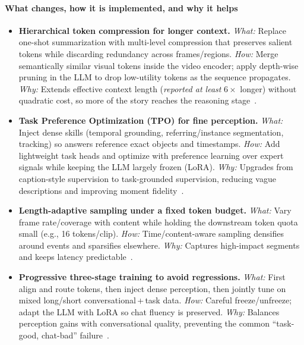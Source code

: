 \begin{enrichment}
\begin{enrichment}
        \paragraph{What changes, how it is implemented, and why it helps}
        \begin{itemize}
            \item \textbf{Hierarchical token compression for longer context.}
            \emph{What:} Replace one-shot summarization with multi-level compression that preserves salient tokens while discarding redundancy across frames/regions. 
            \emph{How:} Merge semantically similar visual tokens inside the video encoder; apply depth-wise pruning in the LLM to drop low-utility tokens as the sequence propagates. 
            \emph{Why:} Extends effective context length (\emph{reported at least} $6{\times}$ longer) without quadratic cost, so more of the story reaches the reasoning stage~\cite{wang2025internvideo2_5}.
            
            \item \textbf{Task Preference Optimization (TPO) for fine perception.}
            \emph{What:} Inject dense skills (temporal grounding, referring/instance segmentation, tracking) so answers reference exact objects and timestamps. 
            \emph{How:} Add lightweight task heads and optimize with preference learning over expert signals while keeping the LLM largely frozen (LoRA). 
            \emph{Why:} Upgrades from caption-style supervision to task-grounded supervision, reducing vague descriptions and improving moment fidelity~\cite{wang2025internvideo2_5}.
            
            \newpage
            
            \item \textbf{Length-adaptive sampling under a fixed token budget.}
            \emph{What:} Vary frame rate/coverage with content while holding the downstream token quota small (e.g., 16 tokens/clip). 
            \emph{How:} Time/content-aware sampling densifies around events and sparsifies elsewhere. 
            \emph{Why:} Captures high-impact segments and keeps latency predictable~\cite{wang2025internvideo2_5}.
            
            \item \textbf{Progressive three-stage training to avoid regressions.}
            \emph{What:} First align and route tokens, then inject dense perception, then jointly tune on mixed long/short conversational\,+\,task data. 
            \emph{How:} Careful freeze/unfreeze; adapt the LLM with LoRA so chat fluency is preserved. 
            \emph{Why:} Balances perception gains with conversational quality, preventing the common ``task-good, chat-bad'' failure~\cite{wang2025internvideo2_5}.
        \end{itemize}
        

\end{enrichment}
\end{enrichment}
